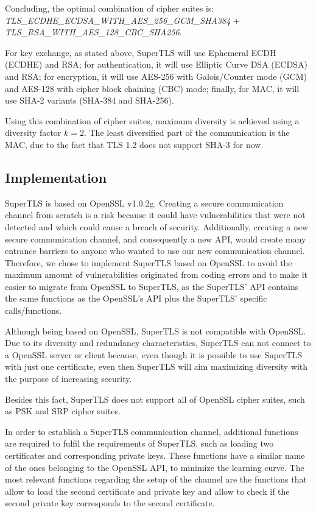 \documentclass{sig-alternate-05-2015}
\begin{document}
Concluding, the optimal combination of cipher suites is:\\
\textit{TLS\_ECDHE\_ECDSA\_WITH\_AES\_256\_GCM\_SHA384} + \\\textit{TLS\_RSA\_WITH\_AES\_128\_CBC\_SHA256}.

For key exchange, as stated above, SuperTLS will use Ephemeral ECDH (ECDHE) and RSA; for authentication, it will use Elliptic Curve DSA (ECDSA) and RSA; for encryption, it will use AES-256 with Galois/Counter mode (GCM) and AES-128 with cipher block chaining (CBC) mode; finally, for MAC, it will use SHA-2 variants (SHA-384 and SHA-256).

Using this combination of cipher suites, maximum diversity is achieved using a diversity factor $k = 2$. The least diversified part of the communication is the MAC, due to the fact that TLS 1.2 does not support SHA-3 for now.

\subsection{Implementation}

SuperTLS is based on OpenSSL v1.0.2g. Creating a secure communication channel from scratch is a risk because it could have vulnerabilities that were not detected and which could cause a breach of security. Additionally, creating a new secure communication channel, and consequently a new API, would create many entrance barriers to anyone who wanted to use our new communication channel. Therefore, we chose to implement SuperTLS based on OpenSSL to avoid the maximum amount of vulnerabilities originated from coding errors and to make it easier to migrate from OpenSSL to SuperTLS, as the SuperTLS' API contains the same functions as the OpenSSL's API plus the SuperTLS' specific calls/functions.

Although being based on OpenSSL, SuperTLS is not compatible with OpenSSL. Due to its diversity and redundancy characteristics, SuperTLS can not connect to a OpenSSL server or client because, even though it is possible to use SuperTLS with just one certificate, even then SuperTLS will aim maximizing diversity with the purpose of increasing security.

Besides this fact, SuperTLS does not support all of OpenSSL cipher suites, such as PSK and SRP cipher suites.

In order to establish a SuperTLS communication channel, additional functions are required to fulfil the requirements of SuperTLS, such as loading two certificates and corresponding private keys. These functions have a similar name of the ones belonging to the OpenSSL API, to minimize the learning curve.
The most relevant functions regarding the setup of the channel are the functions that allow to load the second certificate and private key and allow to check if the second private key corresponds to the second certificate.
\end{document}
